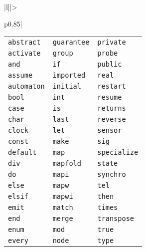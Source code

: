 \documentclass{template/openetcs_article}
\begin{document}
\begin{longtable}{|l||>{\raggedright}p{0.85\linewidth}|}
                          \begin{tabular}{l l l}
                            \texttt{abstract}  & \texttt{guarantee} & \texttt{private}    \\
                            \texttt{activate}  & \texttt{group}     & \texttt{probe}      \\
                            \texttt{and}       & \texttt{if}        & \texttt{public}     \\
                            \texttt{assume}    & \texttt{imported}  & \texttt{real}       \\
                            \texttt{automaton} & \texttt{initial}   & \texttt{restart}    \\
                            \texttt{bool}      & \texttt{int}       & \texttt{resume}     \\
                            \texttt{case}      & \texttt{is}        & \texttt{returns}    \\
                            \texttt{char}      & \texttt{last}      & \texttt{reverse}    \\
                            \texttt{clock}     & \texttt{let}       & \texttt{sensor}     \\
                            \texttt{const}     & \texttt{make}      & \texttt{sig}        \\
                            \texttt{default}   & \texttt{map}       & \texttt{specialize} \\
                            \texttt{div}       & \texttt{mapfold}   & \texttt{state}      \\
                            \texttt{do}        & \texttt{mapi}      & \texttt{synchro}    \\
                            \texttt{else}      & \texttt{mapw}      & \texttt{tel}        \\
                            \texttt{elsif}     & \texttt{mapwi}     & \texttt{then}       \\
                            \texttt{emit}      & \texttt{match}     & \texttt{times}      \\
                            \texttt{end}       & \texttt{merge}     & \texttt{transpose}  \\
                            \texttt{enum}      & \texttt{mod}       & \texttt{true}       \\
                            \texttt{every}     & \texttt{node}      & \texttt{type}       \\

\end{tabular}
\end{longtable}
\end{document}
